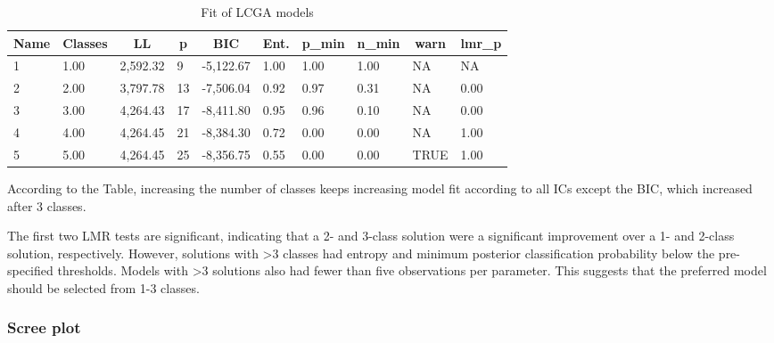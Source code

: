 \documentclass[
  man,floatsintext]{apa6}
\begin{document}
\begin{table}[tbp]

\begin{center}
\begin{threeparttable}

\caption{\label{tab:tabfit}Fit of LCGA models}

\begin{tabular}{llllllllll}
\toprule
Name & \multicolumn{1}{c}{Classes} & \multicolumn{1}{c}{LL} & \multicolumn{1}{c}{p} & \multicolumn{1}{c}{BIC} & \multicolumn{1}{c}{Ent.} & \multicolumn{1}{c}{p\_min} & \multicolumn{1}{c}{n\_min} & \multicolumn{1}{c}{warn} & \multicolumn{1}{c}{lmr\_p}\\
\midrule
1 & 1.00 & 2,592.32 & 9 & -5,122.67 & 1.00 & 1.00 & 1.00 & NA & NA\\
2 & 2.00 & 3,797.78 & 13 & -7,506.04 & 0.92 & 0.97 & 0.31 & NA & 0.00\\
3 & 3.00 & 4,264.43 & 17 & -8,411.80 & 0.95 & 0.96 & 0.10 & NA & 0.00\\
4 & 4.00 & 4,264.45 & 21 & -8,384.30 & 0.72 & 0.00 & 0.00 & NA & 1.00\\
5 & 5.00 & 4,264.45 & 25 & -8,356.75 & 0.55 & 0.00 & 0.00 & TRUE & 1.00\\
\bottomrule
\end{tabular}

\end{threeparttable}
\end{center}

\end{table}

According to the Table, increasing the number of classes keeps
increasing model fit according to all ICs except the BIC, which
increased after 3 classes.

The first two LMR tests are significant, indicating that a 2- and
3-class solution were a significant improvement over a 1- and 2-class
solution, respectively. However, solutions with \textgreater3 classes had entropy
and minimum posterior classification probability below the pre-specified
thresholds. Models with \textgreater3 solutions also had fewer than five
observations per parameter. This suggests that the preferred model
should be selected from 1-3 classes.

\hypertarget{scree-plot}{%
\subsubsection{Scree plot}\label{scree-plot}}
\end{document}
